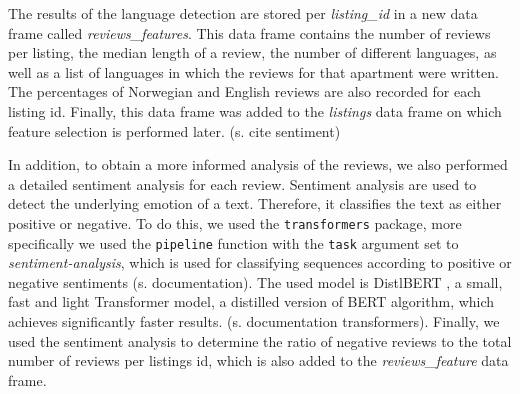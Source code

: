 \documentclass[12pt, letterpaper]{article}
\begin{document}
The results of the language detection are stored per \textit{listing\_id} in a new data frame called \textit{reviews\_features}.
This data frame contains the number of reviews per listing, the median length of a review, the number of different languages,
as well as a list of languages in which the reviews for that apartment were written. The percentages of Norwegian and English reviews are
also recorded for each listing id. Finally, this data frame was added to the \textit{listings} data frame on which feature selection
is performed later. (s. cite sentiment)

In addition, to obtain a more informed analysis of the reviews, we also performed a detailed sentiment analysis for each review. Sentiment analysis are used to detect the underlying emotion of a text. Therefore, it classifies the text as either positive or negative.
To do this, we used the \texttt{transformers} package, more specifically we used the \texttt{pipeline} function
with the \texttt{task} argument set to \textit{sentiment-analysis}, which is used for classifying sequences
according to positive or negative sentiments (s. documentation). The used model is DistlBERT \cite{sanh2020},
a small, fast and light Transformer model, a distilled version of BERT \cite{devlin2019} algorithm, which achieves significantly faster results. (s. documentation transformers).
Finally, we used the sentiment analysis to determine the ratio of negative reviews to the total number of reviews per listings id, which is also added to the \textit{reviews\_feature} data frame.

\end{document}
